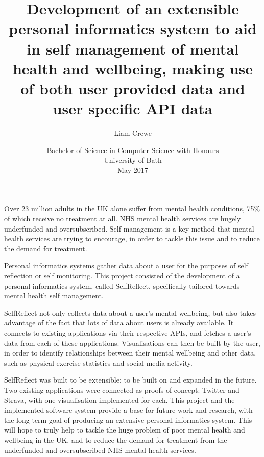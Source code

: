 \documentclass[11pt,openright,a4paper]{report}
\title{Development of an extensible personal informatics system to aid in self management of mental health and wellbeing, making use of both user provided data and user specific API data}
\author{Liam Crewe}
\date{Bachelor of Science in Computer Science with Honours\\University of Bath\\May 2017}
\begin{document}
\lstset{language=Java,breaklines,breakatwhitespace,basicstyle=\small}

\setcounter{page}{0}

\maketitle
\newpage


\newpage


\newpage


\abstract
Over 23 million adults in the UK alone suffer from mental health conditions, 75\% of which receive no treatment at all. NHS mental health services are hugely underfunded and oversubscribed. Self management is a key method that mental health services are trying to encourage, in order to tackle this issue and to reduce the demand for treatment.

Personal informatics systems gather data about a user for the purposes of self reflection or self monitoring. This project consisted of the development of a personal informatics system, called SelfReflect, specifically tailored towards mental health self management.

SelfReflect not only collects data about a user's mental wellbeing, but also takes advantage of the fact that lots of data about users is already available. It connects to existing applications via their respective APIs, and fetches a user's data from each of these applications. Visualisations can then be built by the user, in order to identify relationships between their mental wellbeing and other data, such as physical exercise statistics and social media activity.

SelfReflect was built to be extensible; to be built on and expanded in the future. Two existing applications were connected as proofs of concept: Twitter and Strava, with one visualisation implemented for each. This project and the implemented software system provide a base for future work and research, with the long term goal of producing an extensive personal informatics system. This will hope to truly help to tackle the huge problem of poor mental health and wellbeing in the UK, and to reduce the demand for treatment from the underfunded and oversubscribed NHS mental health services.
\newpage
\end{document}
